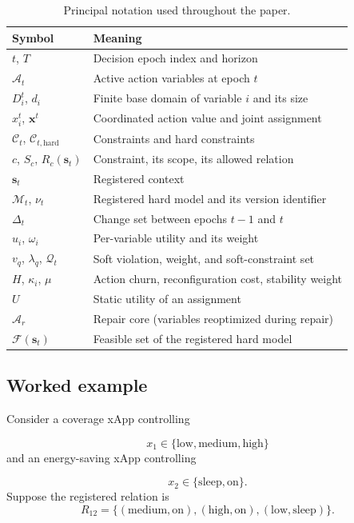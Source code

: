 \documentclass[pdflatex,sn-mathphys-num,iicol,oneside]{sn-jnl}
\begin{document}
\begin{table}[t]
\centering
\caption{Principal notation used throughout the paper.}
\label{tab:notation}
\footnotesize
\begin{tabular}{ll}
\toprule
Symbol & Meaning\\
\midrule
$t$, $T$ & Decision epoch index and horizon\\
$\mathcal{A}_t$ & Active action variables at epoch $t$\\
$D_i^t$, $d_i$ & Finite base domain of variable $i$ and its size\\
$x_i^t$, $\bm{x}^t$ & Coordinated action value and joint assignment\\
$\mathcal{C}_t$, $\mathcal{C}_{t,\mathrm{hard}}$ & Constraints and hard constraints\\
$c$, $S_c$, $R_c(\bm{s}_t)$ & Constraint, its scope, its allowed relation\\
$\bm{s}_t$ & Registered context\\
$\mathcal{M}_t$, $\nu_t$ & Registered hard model and its version identifier\\
$\Delta_t$ & Change set between epochs $t-1$ and $t$\\
$u_i$, $\omega_i$ & Per-variable utility and its weight\\
$v_q$, $\lambda_q$, $\mathcal{Q}_t$ & Soft violation, weight, and soft-constraint set\\
$H$, $\kappa_i$, $\mu$ & Action churn, reconfiguration cost, stability weight\\
$U$ & Static utility of an assignment\\
$\mathcal{A}_r$ & Repair core (variables reoptimized during repair)\\
$\mathcal{F}(\bm{s}_t)$ & Feasible set of the registered hard model\\
\bottomrule
\end{tabular}
\end{table}

\subsection{Worked example}
\label{sec:worked-example}

Consider a coverage xApp controlling

\[
x_1\in
\{
\text{low},
\text{medium},
\text{high}
\}
\]
and an energy-saving xApp controlling

\[
x_2\in
\{
\text{sleep},
\text{on}
\}.
\]
Suppose the registered relation is
\begin{equation}
R_{12}
=
\{
(\text{medium},\text{on}),
(\text{high},\text{on}),
(\text{low},\text{sleep})
\}.
\end{equation}
\end{document}
